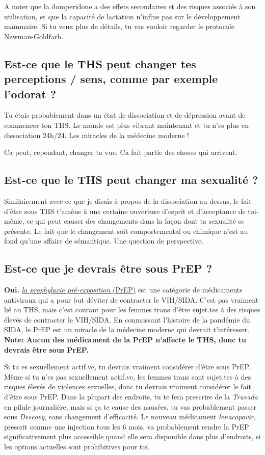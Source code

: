 \documentclass{article}
\begin{document}
A noter que la domperidone a des effets secondaires et des risques associés à son utilisation, et que la capacité de lactation n'influe pas sur le développement mammaire. Si tu veux plus de détails, tu vas vouloir regarder le protocole Newman-Goldfarb.

\subsection{Est-ce que le THS peut changer tes perceptions / sens, comme par exemple l'odorat ?}

Tu étais probablement dans un état de dissociation et de dépression avant de commencer ton THS. Le monde est plus vibrant maintenant et tu n'es plus en dissociation 24h/24. Les miracles de la médecine moderne !

Ca peut, cependant, changer ta vue. Ca fait partie des choses qui arrivent.

\subsection{Est-ce que le THS peut changer ma sexualité ?}

Similairement avec ce que je disais à propos de la dissociation au dessus, le fait d'être sous THS t'amène à une certaine ouverture d'esprit et d'acceptance de toi-même, ce qui peut causer des changements dans la façon dont ta sexualité se présente. Le fait que le changement soit comportemental ou chimique n'est au fond qu'une affaire de sémantique. Une question de perspective.

\subsection{Est-ce que je devrais être sous PrEP ?}

\textbf{Oui.} \href{https://fr.wikipedia.org/wiki/Prophylaxie_pr%C3%A9-exposition}{\textit{la prophylaxie pré-exposition} (PrEP)} est une catégorie de médicaments antiviraux qui a pour but déviter de contracter le VIH/SIDA. C'est pas vraiment lié au THS, mais c'est courant pour les femmes trans d'être sujet.tes à des risques élevés de contracter le VIH/SIDA. En connaissant l'histoire de la pandémie du SIDA, le PrEP est un miracle de la médecine moderne qui devrait t'intéresser. \textbf{Note: Aucun des médicament de la PrEP n'affecte le THS, donc tu devrais être sous PrEP.}

Si tu es sexuellement actif.ve, tu devrais vraiment considérer d'être sous PrEP. Même si tu n'es pas sexuellement actif.ve, les femmes trans sont sujet.tes à des risques élevés de violences sexuelles, donc tu devrais vraiment considérer le fait d'être sous PrEP. Dans la plupart des endroits, tu te fera prescrire de la \textit{Truvada} en pilule journalière, mais si ça te cause des nausées, tu vas probablement passer sous \textit{Descovy}, sans changement d'efficacité. Le nouveau médicament \textit{lenacapavir}, prescrit comme une injection tous les 6 mois, va probablement rendre la PrEP significativement plus accessible quand elle sera disponible dans plus d'endroits, si les options actuelles sont prohibitives pour toi.
\end{document}

